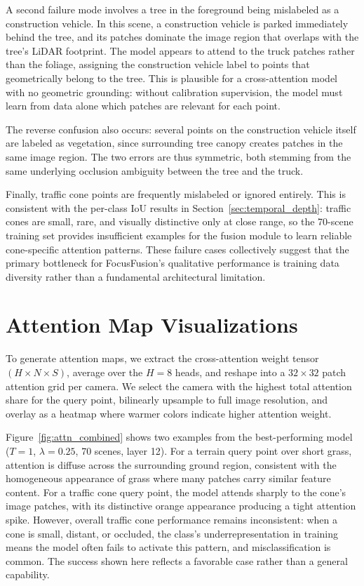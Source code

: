 \documentclass[10pt,twocolumn,letterpaper]{article}
\begin{document}
A second failure mode involves a tree in the foreground being mislabeled as a construction vehicle. In this scene, a construction vehicle is parked immediately behind the tree, and its patches dominate the image region that overlaps with the tree's LiDAR footprint. The model appears to attend to the truck patches rather than the foliage, assigning the construction vehicle label to points that geometrically belong to the tree. This is plausible for a cross-attention model with no geometric grounding: without calibration supervision, the model must learn from data alone which patches are relevant for each point. 

The reverse confusion also occurs: several points on the construction vehicle itself are labeled as vegetation, since surrounding tree canopy creates patches in the same image region. The two errors are thus symmetric, both stemming from the same underlying occlusion ambiguity between the tree and the truck.

Finally, traffic cone points are frequently mislabeled or ignored entirely. This is consistent with the per-class IoU results in Section~\ref{sec:temporal_depth}: traffic cones are small, rare, and visually distinctive only at close range, so the 70-scene training set provides insufficient examples for the fusion module to learn reliable cone-specific attention patterns. These failure cases collectively suggest that the primary bottleneck for FocusFusion's qualitative performance is training data diversity rather than a fundamental architectural limitation.


\section{Attention Map Visualizations}
To generate attention maps, we extract the cross-attention weight tensor $(H \times N \times S)$, average over the $H=8$ heads, and reshape into a $32 \times 32$ patch attention grid per camera. We select the camera with the highest total attention share for the query point, bilinearly upsample to full image resolution, and overlay as a heatmap where warmer colors indicate higher attention weight.

Figure~\ref{fig:attn_combined} shows two examples from the best-performing model ($T=1$, $\lambda=0.25$, 70 scenes, layer 12). For a terrain query point over short grass, attention is diffuse across the surrounding ground region, consistent with the homogeneous appearance of grass where many patches carry similar feature content. For a traffic cone query point, the model attends sharply to the cone's image patches, with its distinctive orange appearance producing a tight attention spike. However, overall traffic cone performance remains inconsistent: when a cone is small, distant, or occluded, the class's underrepresentation in training means the model often fails to activate this pattern, and misclassification is common. The success shown here reflects a favorable case rather than a general capability.
\end{document}
